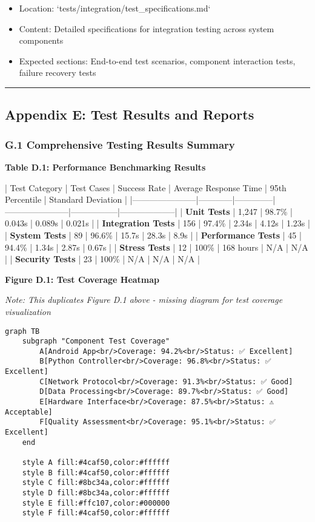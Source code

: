 \documentclass[11pt,a4paper]{article}
\begin{document}
\begin{itemize}
\item Location: `tests/integration/test_specifications.md`
\item Content: Detailed specifications for integration testing across system components
\item Expected sections: End-to-end test scenarios, component interaction tests, failure recovery tests

\end{itemize}
\hrule

\subsection{Appendix E: Test Results and Reports}

\subsubsection{G.1 Comprehensive Testing Results Summary}

\textbf{Table D.1: Performance Benchmarking Results}

| Test Category         | Test Cases | Success Rate | Average Response Time | 95th Percentile | Standard Deviation |
|-----------------------|------------|--------------|-----------------------|-----------------|--------------------|
| \textbf{Unit Tests}        | 1,247      | 98.7\%        | 0.043s                | 0.089s          | 0.021s             |
| \textbf{Integration Tests} | 156        | 97.4\%        | 2.34s                 | 4.12s           | 1.23s              |
| \textbf{System Tests}      | 89         | 96.6\%        | 15.7s                 | 28.3s           | 8.9s               |
| \textbf{Performance Tests} | 45         | 94.4\%        | 1.34s                 | 2.87s           | 0.67s              |
| \textbf{Stress Tests}      | 12         | 100\%         | 168 hours             | N/A             | N/A                |
| \textbf{Security Tests}    | 23         | 100\%         | N/A                   | N/A             | N/A                |

\textbf{Figure D.1: Test Coverage Heatmap}

\textit{Note: This duplicates Figure D.1 above - missing diagram for test coverage visualization}

\begin{verbatim}
graph TB
    subgraph "Component Test Coverage"
        A[Android App<br/>Coverage: 94.2%<br/>Status: ✅ Excellent]
        B[Python Controller<br/>Coverage: 96.8%<br/>Status: ✅ Excellent]
        C[Network Protocol<br/>Coverage: 91.3%<br/>Status: ✅ Good]
        D[Data Processing<br/>Coverage: 89.7%<br/>Status: ✅ Good]
        E[Hardware Interface<br/>Coverage: 87.5%<br/>Status: ⚠️ Acceptable]
        F[Quality Assessment<br/>Coverage: 95.1%<br/>Status: ✅ Excellent]
    end

    style A fill:#4caf50,color:#ffffff
    style B fill:#4caf50,color:#ffffff
    style C fill:#8bc34a,color:#ffffff
    style D fill:#8bc34a,color:#ffffff
    style E fill:#ffc107,color:#000000
    style F fill:#4caf50,color:#ffffff
\end{verbatim}
\end{document}
